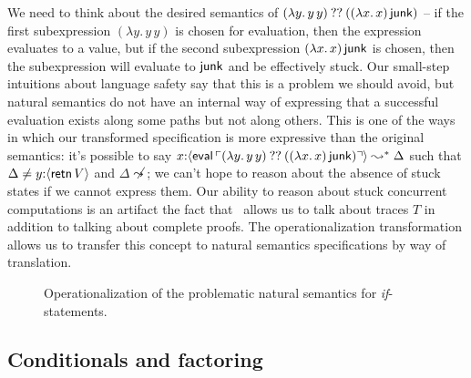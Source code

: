We need to think about the desired semantics of $(\lambda y.\,y\,y)
\mathbin{??} ((\lambda x.\,x)\,{\sf junk})$ -- if the first subexpression
$(\lambda y.\,y\,y)$ is chosen for evaluation, then the expression
evaluates to a value, but if the second subexpression $(\lambda
x.\,x)\,{\sf junk}$ is chosen, then the subexpression will evaluate to
${\sf junk}$ and be effectively stuck. Our small-step intuitions
about language safety say that this is a problem we should avoid, but
natural semantics do not have an internal way of expressing that a
successful evaluation exists along some paths but not along others.
This is one of the ways in which our transformed specification is more
expressive than the original semantics: it's possible to say
$x{:}\langle {{\sf eval}\,{\ulcorner{(\lambda y.\,y\,y) \mathbin{??}((\lambda
    x.\,x)\,{\sf junk})}\urcorner}} \rangle \leadsto^* \Delta$ such that $\Delta \neq
y{:}\langle {{\sf retn}\,V} \rangle$ and $\Delta \not\leadsto$; we can't hope to
reason about the absence of stuck states if we cannot express
them. Our ability to reason about stuck concurrent computations is an
artifact the fact that \sls~allows us to talk about traces $T$ in
addition to talking about complete proofs.  The operationalization
transformation allows us to transfer this concept to natural semantics
specifications by way of translation.

\begin{figure}[t]
\caption{Operationalization of the problematic natural semantics for {\it if}-statements.}
\label{fig:sls-bad-ite}
\end{figure}

\subsection{Conditionals and factoring}

